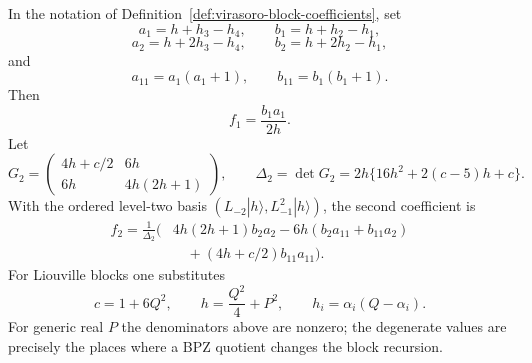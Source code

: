 \begin{lemma}
\label{lem:liouville-virasoro-block-level-two}
In the notation of Definition~\ref{def:virasoro-block-coefficients}, set
\[
  a_1=h+h_3-h_4,\qquad b_1=h+h_2-h_1,
\]
\[
  a_2=h+2h_3-h_4,\qquad b_2=h+2h_2-h_1,
\]
and
\[
  a_{11}=a_1(a_1+1),\qquad b_{11}=b_1(b_1+1).
\]
Then
\begin{equation}
  f_1=\frac{b_1a_1}{2h}.
  \label{eq:liouville-virasoro-block-level-one}
\end{equation}
Let
\[
  G_2=
  \begin{pmatrix}
    4h+c/2 & 6h\\
    6h & 4h(2h+1)
  \end{pmatrix},
  \qquad
  \Delta_2=\det G_2
  =
  2h\{16h^2+2(c-5)h+c\}.
\]
With the ordered level-two basis
\((L_{-2}|h\rangle,L_{-1}^2|h\rangle)\), the second coefficient is
\begin{equation}
\begin{aligned}
  f_2
  =
  \frac1{\Delta_2}
  \bigl(&
    4h(2h+1)b_2a_2
    -6h(b_2a_{11}+b_{11}a_2)
  \\
  &\quad
    +(4h+c/2)b_{11}a_{11}
  \bigr).
\end{aligned}
  \label{eq:liouville-virasoro-block-level-two}
\end{equation}
For Liouville blocks one substitutes
\[
  c=1+6Q^2,\qquad h=\frac{Q^2}{4}+P^2,\qquad
  h_i=\alpha_i(Q-\alpha_i).
\]
For generic real \(P\) the denominators above are nonzero; the degenerate
values are precisely the places where a BPZ quotient changes the block
recursion.
\end{lemma}

